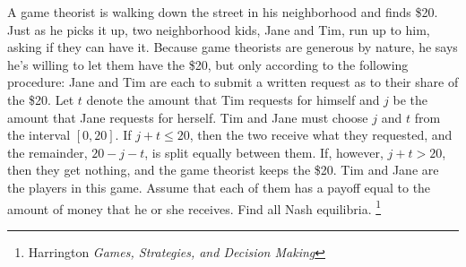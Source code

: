 \documentclass[addpoints ]{exam}
\begin{document}
\begin{questions}
\begin{parts}
\end{parts}

\newpage


\question[20] 
A game theorist is walking down the street in his neighborhood and finds \$20.
Just as he picks it up, two neighborhood kids, 
Jane and Tim,
run up to him, asking if they can have it.
Because game theorists are generous by nature, 
he says he's willing to let them have the \$20,
but only according to the following procedure:
Jane and Tim are each to submit a written request 
as to their share of the \$20. 
Let $t$ denote the amount that Tim requests for himself
and $j$ be the amount that Jane requests for herself.
Tim and Jane must choose $j$ and $t$ from the interval
$[0,20]$.
If $j + t \leq 20$, then the two receive what they requested,
and the remainder, $20 - j - t$, is split equally between them.
If, however, $j + t > 20$, then they get nothing, and the game theorist keeps the \$20.
Tim and Jane are the players in this game.
Assume that each of them has a payoff equal to the amount of money that he or she receives. 
Find all Nash equilibria.
\footnote{Harrington \textit{Games, Strategies, and Decision Making}}






\end{questions}
\end{document}
